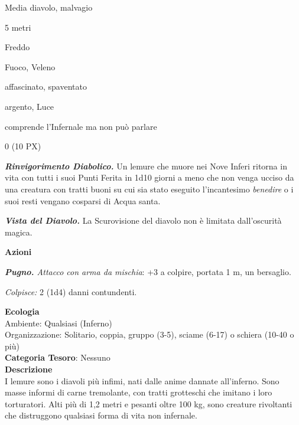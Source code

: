 \begin{multicols}{2}
{
\begin{description}[noitemsep, topsep=0pt, parsep=0pt, partopsep=0pt, itemsep=1pt, leftmargin=2.35cm,  labelwidth=2.2cm, itemindent=0cm, listparindent=0pt] %
\setlength{\baselineskip}{10pt}
\item[\textbf{Taglia/Tipo}] Media diavolo, malvagio
\item[\textbf{Caratt.}] 
\item[\textbf{Punti Ferita}] 
\item[\textbf{Movimento}] 5 metri
\item[\textbf{Tiri Salvez.}] 
\item[\textbf{Res. Danni}] Freddo
\item[\textbf{Imm. Danni}] Fuoco, Veleno
\item[\textbf{Immunità}] affascinato, spaventato
\item[\textbf{Vulnerabilità}] argento, Luce
\item[\textbf{Sensi}] 
\item[\textbf{Linguaggi}] comprende l'Infernale ma non può parlare
\item[\textbf{Sfida}] 0 (10 PX)
\end{description}
\smallskip

\emph{\textbf{Rinvigorimento Diabolico.}} Un lemure che muore nei Nove Inferi ritorna in vita con tutti i suoi Punti Ferita in 1d10 giorni a meno che non venga ucciso da una creatura con tratti buoni su cui sia stato eseguito l'incantesimo \emph{benedire} o i suoi resti vengano cosparsi di Acqua santa.

\emph{\textbf{Vista del Diavolo.}} La Scurovisione del diavolo non è limitata dall'oscurità magica.

\textbf{Azioni}

\emph{\textbf{Pugno.} Attacco con arma da mischia}: +3 a colpire, portata 1 m, un bersaglio.

\emph{Colpisce:} 2 (1d4) danni contundenti.

\textbf{Ecologia}\\
Ambiente: Qualsiasi (Inferno)\\
Organizzazione: Solitario, coppia, gruppo (3-5), sciame (6-17) o schiera (10-40 o più)\\
\textbf{Categoria Tesoro}: Nessuno\\
\textbf{Descrizione}\\
I lemure sono i diavoli più infimi, nati dalle anime dannate all'inferno. Sono masse informi di carne tremolante, con tratti grotteschi che imitano i loro torturatori. Alti più di 1,2 metri e pesanti oltre 100 kg, sono creature rivoltanti che distruggono qualsiasi forma di vita non infernale.

}
\end{multicols}
